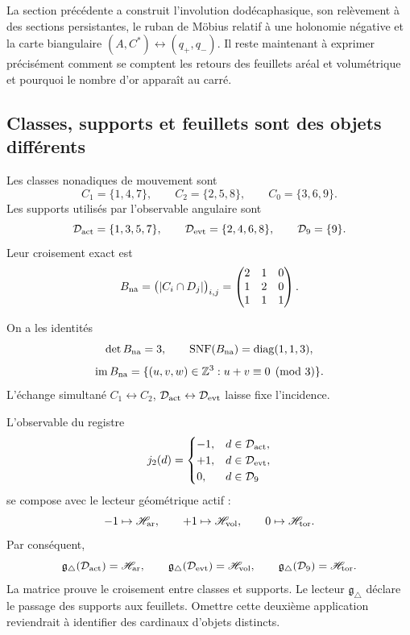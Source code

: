 La section précédente a construit l'involution dodécaphasique, son relèvement à des
sections persistantes, le ruban de Möbius relatif à une holonomie négative
et la carte biangulaire \((A,C^*)\leftrightarrow(q_+,q_-)\). Il reste maintenant à
exprimer précisément comment se comptent les retours des feuillets aréal et
volumétrique et pourquoi le nombre d'or apparaît au carré.

\subsection{Classes, supports et feuillets sont des objets différents}

Les classes nonadiques de mouvement sont
\[
 C_1=\{1,4,7\},\qquad C_2=\{2,5,8\},\qquad C_0=\{3,6,9\}.
\]
Les supports utilisés par l'observable angulaire sont
\[
 \mathcal D_{\rm act}=\{1,3,5,7\},\qquad
 \mathcal D_{\rm evt}=\{2,4,6,8\},\qquad
 \mathcal D_9=\{9\}.
\]
Leur croisement exact est
\[
 B_{\rm na}=\bigl(|C_i\cap D_j|\bigr)_{i,j}
 =\begin{pmatrix}2&1&0\\1&2&0\\1&1&1\end{pmatrix}.
\]

\begin{theorem}
\label{p12-83-c16-s3:thm:incidencia-triadica-corta}
On a les identités
\[
 \det B_{\rm na}=3,
 \qquad
 \operatorname{SNF}(B_{\rm na})=\operatorname{diag}(1,1,3),
\]
\[
 \operatorname{im}B_{\rm na}
 =\{(u,v,w)\in\mathbb Z^3:u+v\equiv0\pmod3\}.
\]
L'échange simultané
\(C_1\leftrightarrow C_2\),
\(\mathcal D_{\rm act}\leftrightarrow\mathcal D_{\rm evt}\) laisse fixe
l'incidence.
\end{theorem}

L'observable du registre
\[
 j_2(d)=
 \begin{cases}
 -1,&d\in\mathcal D_{\rm act},\\
 +1,&d\in\mathcal D_{\rm evt},\\
 0,&d\in\mathcal D_9
 \end{cases}
\]
se compose avec le lecteur géométrique actif :
\[
 -1\mapsto\mathscr H_{\rm ar},\qquad
 +1\mapsto\mathscr H_{\rm vol},\qquad
 0\mapsto\mathscr H_{\rm tor}.
\]
Par conséquent,
\[
 \mathfrak g_\triangle(\mathcal D_{\rm act})=\mathscr H_{\rm ar},\qquad
 \mathfrak g_\triangle(\mathcal D_{\rm evt})=\mathscr H_{\rm vol},\qquad
 \mathfrak g_\triangle(\mathcal D_9)=\mathscr H_{\rm tor}.
\]
La matrice prouve le croisement entre classes et supports. Le lecteur
\(\mathfrak g_\triangle\) déclare le passage des supports aux feuillets. Omettre cette
deuxième application reviendrait à identifier des cardinaux d'objets distincts.

